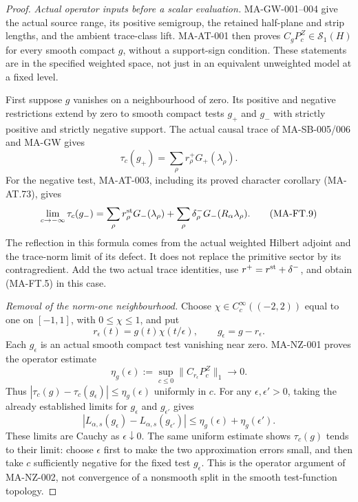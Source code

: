 \begin{proof}
\emph{Actual operator inputs before a scalar evaluation.}
MA-GW-001--004 give the actual source range, its positive
semigroup, the retained half-plane and strip lengths, and the
ambient trace-class lift.  MA-AT-001 then proves
$C_gP_c^Z\in\mathcal S_1(H)$ for every smooth compact $g$,
without a support-sign condition.  These statements are in
the specified weighted space, not just in an equivalent
unweighted model at a fixed level.

First suppose $g$ vanishes on a neighbourhood of zero.
Its positive and negative restrictions extend by zero to
smooth compact tests $g_+$ and $g_-$ with strictly positive
and strictly negative support.  The actual causal trace of
MA-SB-005/006 and MA-GW gives
\[
 \tau_c(g_+)=\sum_\rho r_\rho^+G_+(\lambda_\rho).
 \tag{MA-FT.8}
\]
For the negative test, MA-AT-003, including its proved
character corollary (MA-AT.73), gives
\[
 \lim_{c\to-\infty}\tau_c(g_-)
  =\sum_\rho r_\rho^{\rm st}G_-(\lambda_\rho)
      +\sum_\rho\delta_\rho^-G_-(R_\alpha\lambda_\rho).
 \tag{MA-FT.9}
\]
The reflection in this formula comes from the actual
weighted Hilbert adjoint and the trace-norm limit of its
defect.  It does not replace the primitive sector by its
contragredient.  Add the two actual trace identities, use
$r^+=r^{\rm st}+\delta^-$, and obtain (MA-FT.5) in this case.

\emph{Removal of the norm-one neighbourhood.}
Choose $\chi\in C_c^\infty((-2,2))$ equal to one on
$[-1,1]$, with $0\le\chi\le1$, and put
\[
 r_\epsilon(t)=g(t)\chi(t/\epsilon),\qquad
 g_\epsilon=g-r_\epsilon.
 \tag{MA-FT.10}
\]
Each $g_\epsilon$ is an actual smooth compact test vanishing
near zero.  MA-NZ-001 proves the operator estimate
\[
 \eta_g(\epsilon):=
     \sup_{c\le0}\|C_{r_\epsilon}P_c^Z\|_1
                   \longrightarrow0.
 \tag{MA-FT.11}
\]
Thus $|\tau_c(g)-\tau_c(g_\epsilon)|\le\eta_g(\epsilon)$
uniformly in $c$.  For any $\epsilon,\epsilon'>0$, taking
the already established limits for $g_\epsilon$ and
$g_{\epsilon'}$ gives
\[
 |L_{\alpha,s}(g_\epsilon)-L_{\alpha,s}(g_{\epsilon'})|
              \le\eta_g(\epsilon)+\eta_g(\epsilon').
 \tag{MA-FT.12}
\]
These limits are Cauchy as $\epsilon\downarrow0$.
The same uniform estimate shows $\tau_c(g)$ tends to their
limit: choose $\epsilon$ first to make the two approximation
errors small, and then take $c$ sufficiently negative for
the fixed test $g_\epsilon$.  This is the operator argument
of MA-NZ-002, not convergence of a nonsmooth split in the
smooth test-function topology.


\end{proof}
